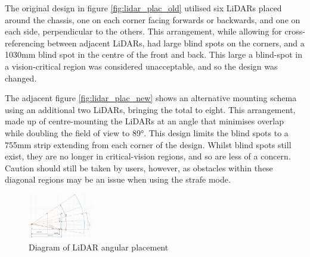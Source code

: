 \documentclass [12pt]{article}
\begin{document}

The original design in figure \ref{fig:lidar_plac_old} utilised six LiDARs placed around the chassis, one on each corner facing forwards or backwards, and one on each side, perpendicular to the others. This arrangement, while allowing for cross-referencing between adjacent LiDARs, had large blind spots on the corners, and a 1030mm blind spot in the centre of the front and back. This large a blind-spot in a vision-critical region was considered unacceptable, and so the design was changed.

The adjacent figure \ref{fig:lidar_plac_new} shows an alternative mounting schema using an additional two LiDARs, bringing the total to eight. This arrangement, made up of centre-mounting the LiDARs at an angle that minimises overlap while doubling the field of view to 89°. This design limits the blind spots to a 755mm strip extending from each corner of the design. Whilst blind spots still exist, they are no longer in critical-vision regions, and so are less of a concern. Caution should still be taken by users, however, as obstacles within these diagonal regions may be an issue when using the strafe mode.

\begin{figure}[h]
    \centering
    \includegraphics[width=0.25\textwidth]{LiDAR_PLACEMENT_GRAPH.png}
    \caption{Diagram of LiDAR angular placement}
    \label{fig:lidar_plac_graph}
\end{figure}
\end{document}
